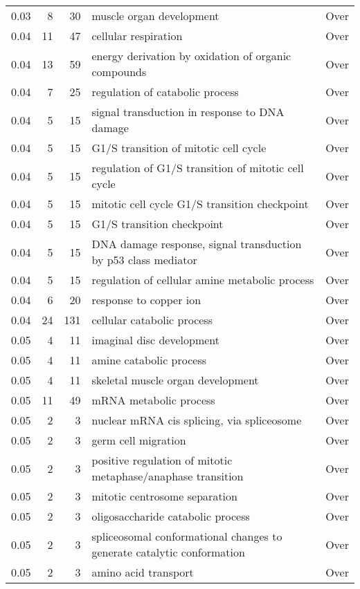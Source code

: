 \documentclass[10pt]{bmc_article}
\newenvironment{bmcformat}{\begin{raggedright}\baselineskip20pt\sloppy\setboolean{publ}{false}}{\end{raggedright}\baselineskip20pt\sloppy}
\begin{document}
\begin{bmcformat}
\begin{longtable}{rrrp{7cm}r}
  0.03 &   8 &  30 & muscle organ development & Over \\ 
  0.04 &  11 &  47 & cellular respiration & Over \\ 
  0.04 &  13 &  59 & energy derivation by oxidation of organic compounds & Over \\ 
  0.04 &   7 &  25 & regulation of catabolic process & Over \\ 
  0.04 &   5 &  15 & signal transduction in response to DNA damage & Over \\ 
  0.04 &   5 &  15 & G1/S transition of mitotic cell cycle & Over \\ 
  0.04 &   5 &  15 & regulation of G1/S transition of mitotic cell cycle & Over \\ 
  0.04 &   5 &  15 & mitotic cell cycle G1/S transition checkpoint & Over \\ 
  0.04 &   5 &  15 & G1/S transition checkpoint & Over \\ 
  0.04 &   5 &  15 & DNA damage response, signal transduction by p53 class mediator & Over \\ 
  0.04 &   5 &  15 & regulation of cellular amine metabolic process & Over \\ 
  0.04 &   6 &  20 & response to copper ion & Over \\ 
  0.04 &  24 & 131 & cellular catabolic process & Over \\ 
  0.05 &   4 &  11 & imaginal disc development & Over \\ 
  0.05 &   4 &  11 & amine catabolic process & Over \\ 
  0.05 &   4 &  11 & skeletal muscle organ development & Over \\ 
  0.05 &  11 &  49 & mRNA metabolic process & Over \\ 
  0.05 &   2 &   3 & nuclear mRNA cis splicing, via spliceosome & Over \\ 
  0.05 &   2 &   3 & germ cell migration & Over \\ 
  0.05 &   2 &   3 & positive regulation of mitotic metaphase/anaphase transition & Over \\ 
  0.05 &   2 &   3 & mitotic centrosome separation & Over \\ 
  0.05 &   2 &   3 & oligosaccharide catabolic process & Over \\ 
  0.05 &   2 &   3 & spliceosomal conformational changes to generate catalytic conformation & Over \\ 
  0.05 &   2 &   3 & amino acid transport & Over \\ 

\end{longtable}
\end{bmcformat}
\end{document}
